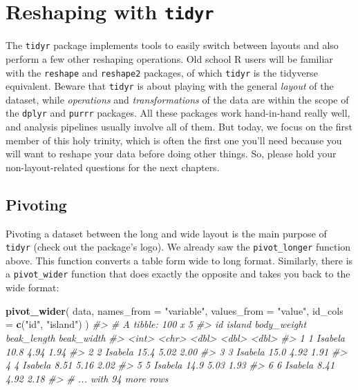 \documentclass[]{book}
\newenvironment{Shaded}{}{}
\newcommand{\CommentTok}[1]{\textcolor[rgb]{0.38,0.63,0.69}{\textit{#1}}}
\newcommand{\DataTypeTok}[1]{\textcolor[rgb]{0.56,0.13,0.00}{#1}}
\newcommand{\KeywordTok}[1]{\textcolor[rgb]{0.00,0.44,0.13}{\textbf{#1}}}
\newcommand{\NormalTok}[1]{#1}
\newcommand{\StringTok}[1]{\textcolor[rgb]{0.25,0.44,0.63}{#1}}
\begin{document}
\hypertarget{reshaping-with-tidyr}{%
\section{\texorpdfstring{Reshaping with \texttt{tidyr}}{Reshaping with tidyr}}\label{reshaping-with-tidyr}}

The \texttt{tidyr} package implements tools to easily switch between layouts and also perform a few other reshaping operations. Old school R users will be familiar with the \texttt{reshape} and \texttt{reshape2} packages, of which \texttt{tidyr} is the tidyverse equivalent. Beware that \texttt{tidyr} is about playing with the general \emph{layout} of the dataset, while \emph{operations} and \emph{transformations} of the data are within the scope of the \texttt{dplyr} and \texttt{purrr} packages. All these packages work hand-in-hand really well, and analysis pipelines usually involve all of them. But today, we focus on the first member of this holy trinity, which is often the first one you'll need because you will want to reshape your data before doing other things. So, please hold your non-layout-related questions for the next chapters.

\hypertarget{pivoting}{%
\subsection{Pivoting}\label{pivoting}}

Pivoting a dataset between the long and wide layout is the main purpose of \texttt{tidyr} (check out the package's logo). We already saw the \texttt{pivot\_longer} function above. This function converts a table form wide to long format. Similarly, there is a \texttt{pivot\_wider} function that does exactly the opposite and takes you back to the wide format:

\begin{Shaded}
\begin{Highlighting}[]
\KeywordTok{pivot_wider}\NormalTok{(}
\NormalTok{  data,}
  \DataTypeTok{names_from =} \StringTok{"variable"}\NormalTok{,}
  \DataTypeTok{values_from =} \StringTok{"value"}\NormalTok{,}
  \DataTypeTok{id_cols =} \KeywordTok{c}\NormalTok{(}\StringTok{"id"}\NormalTok{, }\StringTok{"island"}\NormalTok{)}
\NormalTok{)}
\CommentTok{#> # A tibble: 100 x 5}
\CommentTok{#>      id island  body_weight beak_length beak_width}
\CommentTok{#>   <int> <chr>         <dbl>       <dbl>      <dbl>}
\CommentTok{#> 1     1 Isabela       10.8         4.94       1.94}
\CommentTok{#> 2     2 Isabela       15.4         5.02       2.00}
\CommentTok{#> 3     3 Isabela       15.0         4.92       1.91}
\CommentTok{#> 4     4 Isabela        8.51        5.16       2.02}
\CommentTok{#> 5     5 Isabela       14.9         5.03       1.93}
\CommentTok{#> 6     6 Isabela        8.41        4.92       2.18}
\CommentTok{#> # ... with 94 more rows}
\end{Highlighting}
\end{Shaded}
\end{document}
